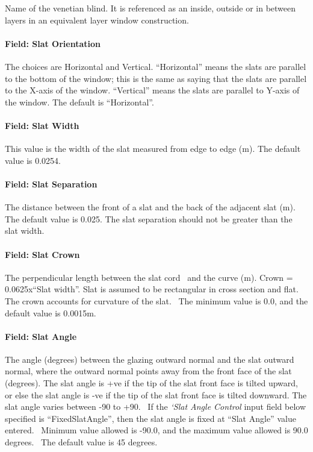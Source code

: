 Name of the venetian blind. It is referenced as an inside, outside or in between layers in an equivalent layer window construction.

\paragraph{Field: Slat Orientation}\label{field-slat-orientation-1}

The choices are Horizontal and Vertical. ``Horizontal'' means the slats are parallel to the bottom of the window; this is the same as saying that the slats are parallel to the X-axis of the window. ``Vertical'' means the slats are parallel to Y-axis of the window. The default is ``Horizontal''.

\paragraph{Field: Slat Width}\label{field-slat-width-2}

This value is the width of the slat measured from edge to edge (m). The default value is 0.0254.

\paragraph{Field: Slat Separation}\label{field-slat-separation-1}

The distance between the front of a slat and the back of the adjacent slat (m). The default value is 0.025. The slat separation should not be greater than the slat width.

\paragraph{Field: Slat Crown}\label{field-slat-crown}

The perpendicular length between the slat cord ~and the curve (m). Crown = 0.0625x``Slat width''. Slat is assumed to be rectangular in cross section and flat. The crown accounts for curvature of the slat.~ The minimum value is 0.0, and the default value is 0.0015m.

\paragraph{Field: Slat Angle}\label{field-slat-angle-2}

The angle (degrees) between the glazing outward normal and the slat outward normal, where the outward normal points away from the front face of the slat (degrees). The slat angle is +ve if the tip of the slat front face is tilted upward, or else the slat angle is -ve if the tip of the slat front face is tilted downward. The slat angle varies between -90 to +90.~ If the \textit{`Slat Angle Control} input field below specified is ``FixedSlatAngle'', then the slat angle is fixed at ``Slat Angle'' value entered.~ Minimum value allowed is -90.0, and the maximum value allowed is 90.0 degrees.~ The default value is 45 degrees.

